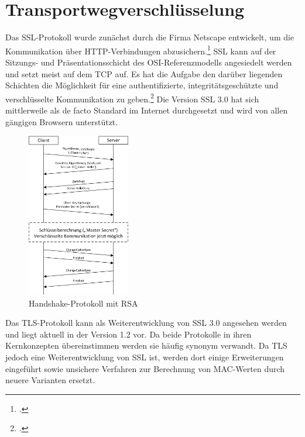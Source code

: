 \chapter{Transportwegverschlüsselung}
Das \ac{SSL}-Protokoll wurde zunächst durch die Firma Netscape entwickelt, um die Kommunikation über \ac{HTTP}-Verbindungen abzusichern.\footcite[Vgl.][S. 796]{Eckert2013} \ac{SSL} kann auf der Sitzungs- und Präsentationsschicht des \ac{OSI}-Referenzmodells angesiedelt werden und setzt meist auf dem \ac{TCP} auf. Es hat die Aufgabe den darüber liegenden Schichten die Möglichkeit für eine authentifizierte, integritätsgeschützte und verschlüsselte Kommunikation zu geben.\footcite[Vgl.][S. 799 ff.]{Eckert2013}
Die Version \ac{SSL} 3.0 hat sich mittlerweile als de facto Standard im Internet durchgesetzt und wird von allen gängigen Browsern unterstützt.\\

\begin{figure} %
	\begin{center}
		\includegraphics[width=0.4\textwidth]{images/MSC_Transport.png}
	\end{center}
	\caption[Handshake-Protokoll mit RSA]{Handshake-Protokoll mit RSA\footnotemark} %
	\label{img:MSC_Transport} %
\end{figure} %
Das \ac{TLS}-Protokoll kann als Weiterentwicklung von \ac{SSL} 3.0 angesehen werden und liegt aktuell in der Version 1.2 vor.
Da beide Protokolle in ihren Kernkonzepten übereinstimmen werden sie häufig synonym verwandt. Da \ac{TLS} jedoch eine Weiterentwicklung von \ac{SSL} ist, werden dort einige Erweiterungen eingeführt sowie unsichere Verfahren zur Berechnung von \ac{MAC}-Werten durch neuere Varianten ersetzt.\\

